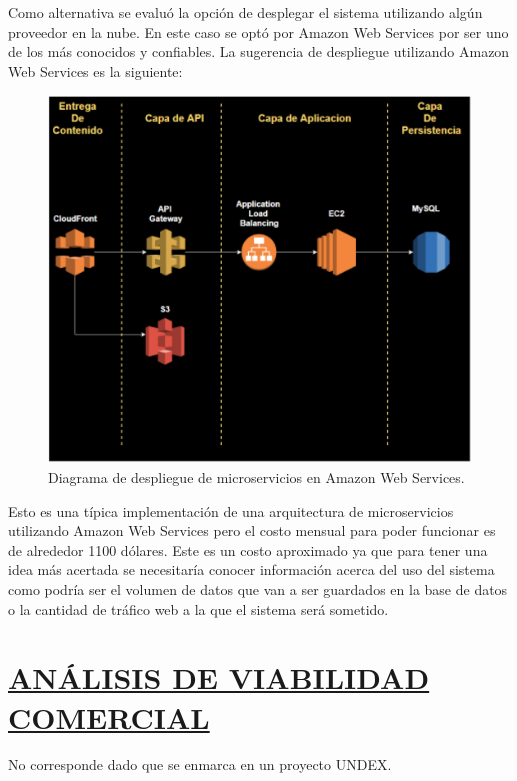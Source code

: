 Como alternativa se evaluó la opción de desplegar el sistema utilizando algún proveedor en la nube. En este caso se optó por Amazon Web Services por ser uno de los más conocidos y confiables. La sugerencia de despliegue utilizando Amazon Web Services es la siguiente: \\

\begin{figure}[H]
	\centering
	\includegraphics[width=\textwidth]{imagenes/aws_archi.png} 
	\caption{Diagrama de despliegue de microservicios en Amazon Web Services.}
\end{figure}

Esto es una típica implementación de una arquitectura de microservicios utilizando Amazon Web Services pero el costo mensual para poder funcionar es de alrededor 1100 dólares. Este es un costo aproximado ya que para tener una idea más acertada se necesitaría conocer información acerca del uso del sistema como podría ser el volumen de datos que van a ser guardados en la base de datos o la cantidad de tráfico web a la que el sistema será sometido.\\

\section*{\underline{ANÁLISIS DE VIABILIDAD COMERCIAL}}
No corresponde dado que se enmarca en un proyecto UNDEX.\\


